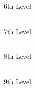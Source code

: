 \documentclass[a4paper,10pt,bg=full]{dndbook} %
\def\SixthLevelSpells{
	\begin{tabularx}{\linewidth}{lX}
		
	\end{tabularx}
}
\def\SeventhLevelSpells{
	\begin{tabularx}{\linewidth}{lX}
		
	\end{tabularx}
}
\def\EightLevelSpells{
	\begin{tabularx}{\linewidth}{lX}
		
	\end{tabularx}
}
\def\NinthLevelSpells{
	\begin{tabularx}{\linewidth}{lX}
		
	\end{tabularx}
}
\begin{document}
	\begin{minipage}[t]{.333\linewidth}\scriptsize
		
		\textcolor{titlered}{\large 6th Level}\\
		\SixthLevelSpells
		\textcolor{titlered}{\large 7th Level}\\
		\SeventhLevelSpells
		\textcolor{titlered}{\large 8th Level}\\
		\EightLevelSpells
		\textcolor{titlered}{\large 9th Level}\\
		\NinthLevelSpells
	\end{minipage} %
\end{document}
